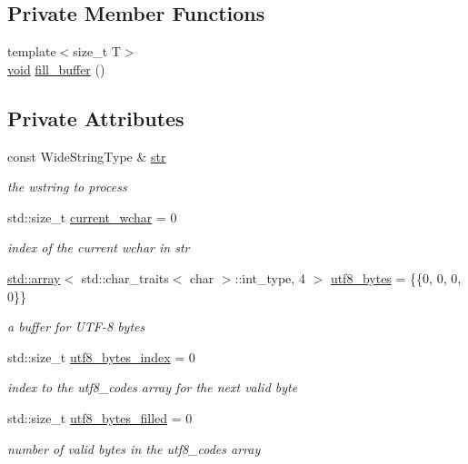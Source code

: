\subsection*{Private Member Functions}
\begin{DoxyCompactItemize}
\item 
{\footnotesize template$<$size\+\_\+t T$>$ }\\\hyperlink{namespacenlohmann_1_1detail_a59fca69799f6b9e366710cb9043aa77d}{void} \hyperlink{classnlohmann_1_1detail_1_1wide__string__input__adapter_ab718e44c524fa7ec74b0a0ae1ad64ca4}{fill\+\_\+buffer} ()
\end{DoxyCompactItemize}
\subsection*{Private Attributes}
\begin{DoxyCompactItemize}
\item 
const Wide\+String\+Type \& \hyperlink{classnlohmann_1_1detail_1_1wide__string__input__adapter_a30fcb522f072d58eb0fb52cfb784e9c9}{str}
\begin{DoxyCompactList}\small\item\em the wstring to process \end{DoxyCompactList}\item 
std\+::size\+\_\+t \hyperlink{classnlohmann_1_1detail_1_1wide__string__input__adapter_a196fe1fb07310dc8c2ca3a0a9ef9b27a}{current\+\_\+wchar} = 0
\begin{DoxyCompactList}\small\item\em index of the current wchar in str \end{DoxyCompactList}\item 
\hyperlink{namespacenlohmann_1_1detail_a1ed8fc6239da25abcaf681d30ace4985af1f713c9e000f5d3f280adbd124df4f5}{std\+::array}$<$ std\+::char\+\_\+traits$<$ char $>$\+::int\+\_\+type, 4 $>$ \hyperlink{classnlohmann_1_1detail_1_1wide__string__input__adapter_af0854ae66725357d074912379a235128}{utf8\+\_\+bytes} = \{\{0, 0, 0, 0\}\}
\begin{DoxyCompactList}\small\item\em a buffer for U\+T\+F-\/8 bytes \end{DoxyCompactList}\item 
std\+::size\+\_\+t \hyperlink{classnlohmann_1_1detail_1_1wide__string__input__adapter_a6d87bc3e8b427e06cda936383283e0c4}{utf8\+\_\+bytes\+\_\+index} = 0
\begin{DoxyCompactList}\small\item\em index to the utf8\+\_\+codes array for the next valid byte \end{DoxyCompactList}\item 
std\+::size\+\_\+t \hyperlink{classnlohmann_1_1detail_1_1wide__string__input__adapter_a9fc33bf0974526336e53ea530c7097ff}{utf8\+\_\+bytes\+\_\+filled} = 0
\begin{DoxyCompactList}\small\item\em number of valid bytes in the utf8\+\_\+codes array \end{DoxyCompactList}\end{DoxyCompactItemize}


